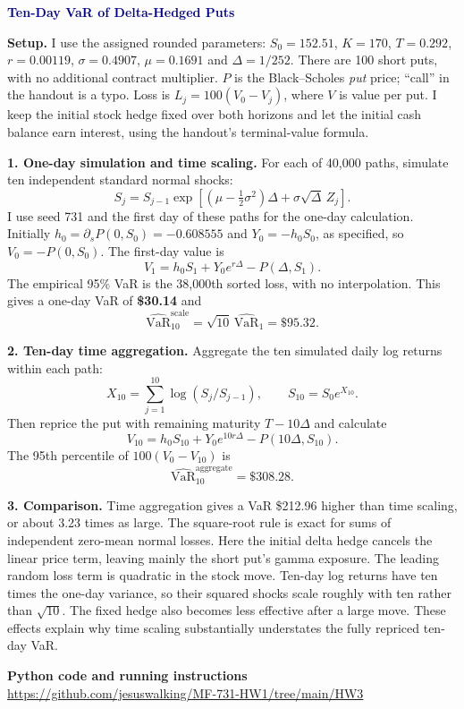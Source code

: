 \documentclass[10pt,letterpaper]{article}
\begin{document}
{\LARGE\bfseries\textcolor{navy}{Ten-Day VaR of Delta-Hedged Puts}}

\textbf{Setup.} I use the assigned rounded parameters:
$S_0=152.51$, $K=170$, $T=0.292$, $r=0.00119$,
$\sigma=0.4907$, $\mu=0.1691$ and $\Delta=1/252$.
There are 100 short puts, with no additional contract multiplier.
$P$ is the Black--Scholes \emph{put} price; ``call'' in the handout is a typo.
Loss is $L_j=100(V_0-V_j)$, where $V$ is value per put.
I keep the initial stock hedge fixed over both horizons and let the initial
cash balance earn interest, using the handout's terminal-value formula.

\textbf{1. One-day simulation and time scaling.}
For each of 40,000 paths, simulate ten independent standard normal shocks:
\[
S_j=S_{j-1}\exp\!\left[
  \left(\mu-\tfrac12\sigma^2\right)\Delta
  +\sigma\sqrt{\Delta}\,Z_j\right].
\]
I use seed 731 and the first day of these paths for the one-day calculation.
Initially $h_0=\partial_sP(0,S_0)=-0.608555$ and
$Y_0=-h_0S_0$, as specified, so $V_0=-P(0,S_0)$.
The first-day value is
\[
V_1=h_0S_1+Y_0e^{r\Delta}-P(\Delta,S_1).
\]
The empirical 95\% VaR is the 38,000th sorted loss, with no interpolation.
This gives a one-day VaR of \textbf{\$30.14} and
\[
\widehat{\mathrm{VaR}}_{10}^{\mathrm{scale}}
=\sqrt{10}\,\widehat{\mathrm{VaR}}_1
=\boxed{\$95.32}.
\]

\textbf{2. Ten-day time aggregation.}
Aggregate the ten simulated daily log returns within each path:
\[
X_{10}=\sum_{j=1}^{10}\log(S_j/S_{j-1}),
\qquad S_{10}=S_0e^{X_{10}}.
\]
Then reprice the put with remaining maturity $T-10\Delta$ and calculate
\[
V_{10}=h_0S_{10}+Y_0e^{10r\Delta}-P(10\Delta,S_{10}).
\]
The 95th percentile of $100(V_0-V_{10})$ is
\[
\widehat{\mathrm{VaR}}_{10}^{\mathrm{aggregate}}=\boxed{\$308.28}.
\]

\textbf{3. Comparison.}
Time aggregation gives a VaR \$212.96 higher than time scaling,
or about 3.23 times as large. The square-root rule is exact for sums of
independent zero-mean normal losses. Here the initial delta hedge
cancels the linear price term, leaving mainly the short put's gamma exposure.
The leading random loss term is quadratic in the stock move. Ten-day log
returns have ten times the one-day variance, so their squared shocks scale
roughly with ten rather than $\sqrt{10}$. The fixed hedge also becomes less
effective after a large move. These effects explain why time scaling
substantially understates the fully repriced ten-day VaR.

\vfill
\begin{center}
\colorbox{pale}{\parbox{0.94\linewidth}{\centering
\textbf{Python code and running instructions}\\[4pt]
\url{https://github.com/jesuswalking/MF-731-HW1/tree/main/HW3}
}}
\end{center}
\end{document}

